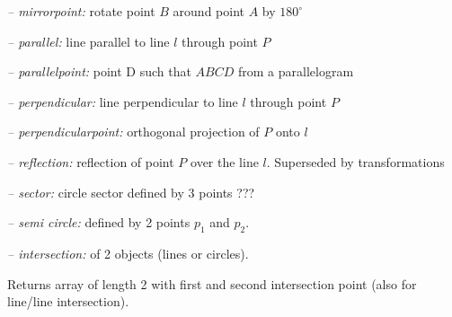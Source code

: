 \par{\sl -- mirrorpoint:} \hfill rotate point $B$ around point $A$ by $180^\circ$
\par{\sl -- parallel:} \hfill line parallel to line $l$ through point $P$
\par{\sl -- parallelpoint:} \hfill point D such that $ABCD$ from a parallelogram
\par{\sl -- perpendicular:} \hfill line perpendicular to line $l$ through point $P$
\par{\sl -- perpendicularpoint:} \hfill  orthogonal projection of $P$ onto $l$

\par{\sl -- reflection:} \hfill reflection of point $P$ over the line $l$. 
Superseded by transformations

\par{\sl -- sector:} \hfill circle sector defined by 3 points \hfill ???

\par{\sl -- semi circle:} \hfill defined by 2 points $p_1$ and $p_2$.

\par{\sl -- intersection:} \hfill of 2 objects (lines or circles). 

Returns array of length 2 with first and second intersection point (also for line/line intersection).


